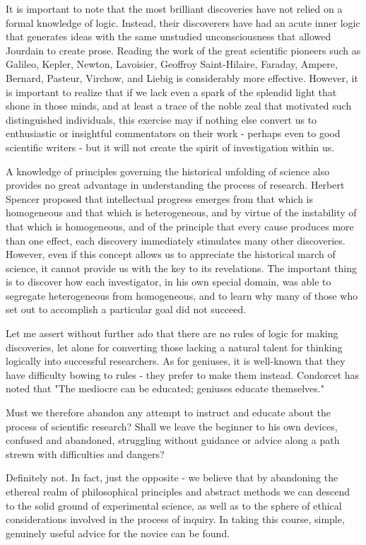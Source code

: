 \documentclass{article}
\begin{document}
It is important to note that the most brilliant discoveries have not relied on a formal knowledge of logic. Instead, their discoverers have had an acute inner logic that generates ideas with the same unstudied unconsciousness that allowed Jourdain to create prose. Reading the work of the great scientific pioneers such as Galileo, Kepler, Newton, Lavoisier, Geoffroy Saint-Hilaire, Faraday, Ampere, Bernard, Pasteur, Virchow, and Liebig is considerably more effective. However, it is important to realize that if we lack even a spark of the splendid light that shone in those minds, and at least a trace of the noble zeal that motivated such distinguished individuals, this exercise may if nothing else convert us to enthusiastic or insightful commentators on their work - perhaps even to good scientific writers - but it will not create the spirit of investigation within us.

A knowledge of principles governing the historical unfolding of science also provides no great advantage in understanding the process of research. Herbert Spencer proposed that intellectual progress emerges from that which is homogeneous and that which is heterogeneous, and by virtue of the instability of that which is homogeneous, and of the principle that every cause produces more than one effect, each discovery immediately stimulates many other discoveries. However, even if this concept allows us to appreciate the historical march of science, it cannot provide us with the key to its revelations. The important thing is to discover how each investigator, in his own special domain, was able to segregate heterogeneous from homogeneous, and to learn why many of those who set out to accomplish a particular goal did not succeed.

Let me assert without further ado that there are no rules of logic for making discoveries, let alone for converting those lacking a natural talent for thinking logically into successful researchers. As for geniuses, it is well-known that they have difficulty bowing to rules - they prefer to make them instead. Condorcet has noted that "The mediocre can be educated; geniuses educate themselves."

Must we therefore abandon any attempt to instruct and educate about the process of scientific research? Shall we leave the beginner to his own devices, confused and abandoned, struggling without guidance or advice along a path strewn with difficulties and dangers?

Definitely not. In fact, just the opposite - we believe that by abandoning the ethereal realm of philosophical principles and abstract methods we can descend to the solid ground of experimental science, as well as to the sphere of ethical considerations involved in the process of inquiry. In taking this course, simple, genuinely useful advice for the novice can be found.
\end{document}
